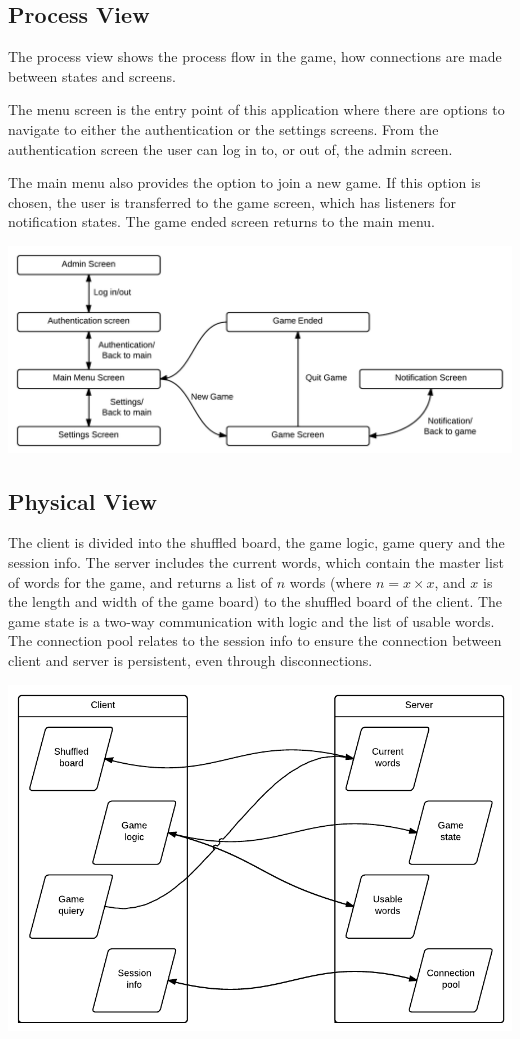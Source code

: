 \subsection{Process View}
The process view shows the process flow in the game, how connections are made
between states and screens.

The menu screen is the entry point of this application where there are options
to navigate to either the authentication or the settings screens. From the
authentication screen the user can log in to, or out of, the admin screen.

The main menu also provides the option to join a new game. If this option is
chosen, the user is transferred to the game screen, which has listeners for
notification states. The game ended screen returns to the main menu.
\begin{center}
\includegraphics[clip=true, width=0.9 \textwidth]{assets/ProcessView.png}
\label{ref:gantt}
\end{center}

\subsection{Physical View}
The client is divided into the shuffled board, the game logic, game query and
the session info. The server includes the current words, which contain the
master list of words for the game, and returns a list of $n$ words (where
$n = x\times x$, and $x$ is the length and width of the game board) to the
shuffled board of the client. The game state is a two-way communication with
logic and the list of usable words. The connection pool relates to the session
info to ensure the connection between client and server is persistent, even
through disconnections.
\begin{center}
\includegraphics[clip=true, width=0.9 \textwidth]{assets/PhysicalView.pdf}
\label{ref:gantt}
\end{center}
